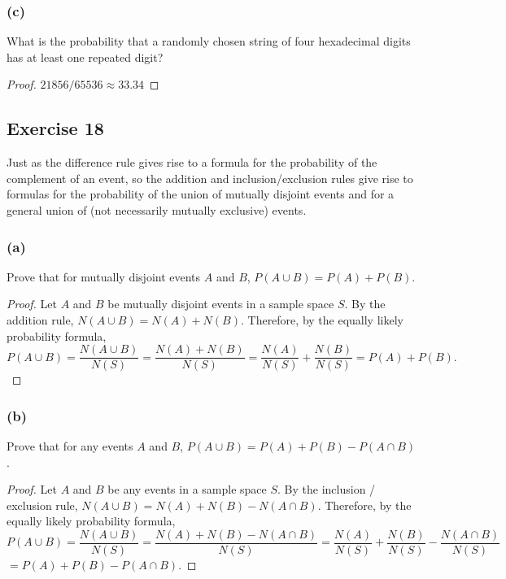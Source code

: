 \documentclass[14pt]{extarticle}
\begin{document}
\subsubsection{(c)}
What is the probability that a randomly chosen string of four hexadecimal digits has at least one repeated digit?

\begin{proof}
\(21856 / 65536 \approx 33.34\)
\end{proof}

\subsection{Exercise 18}
Just as the difference rule gives rise to a formula for the probability of the complement of an event, so the addition 
and inclusion/exclusion rules give rise to formulas for the probability of the union of mutually disjoint events and 
for a general union of (not necessarily mutually exclusive) events.

\subsubsection{(a)}
Prove that for mutually disjoint events $A$ and $B$, \(P(A \cup B) = P(A) + P(B)\).

\begin{proof}
Let $A$ and $B$ be mutually disjoint events in a sample space $S$. By the addition rule, \(N(A \cup B) = N(A) + 
N(B)\). Therefore, by the equally likely probability formula,
\[
P(A \cup B)=\frac{N(A\cup B)}{N(S)}=\frac{N(A)+N(B)}{N(S)}= \frac{N(A)}{N(S)} + \frac{N(B)}{N(S)} = P(A) + P(B).
\]
\end{proof}

\subsubsection{(b)}
Prove that for any events $A$ and $B$, \(P(A \cup B) = P(A) + P(B) - P(A \cap B)\).

\begin{proof}
Let $A$ and $B$ be any events in a sample space $S$. By the inclusion / exclusion rule, \(N(A \cup B) = N(A) + N(B) -
N(A \cap B)\). Therefore, by the equally likely probability formula,
\[
P(A \cup B) = \frac{N(A \cup B)}{N(S)}=\frac{N(A) + N(B) - N(A \cap B)}{N(S)}= \frac{N(A)}{N(S)} + \frac{N(B)}{N(S)} -
\frac{N(A \cap B)}{N(S)}
\]
\(= P(A) + P(B) - P(A \cap B)\).
\end{proof}
\end{document}
